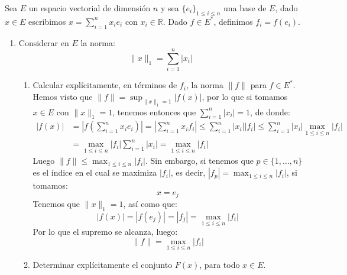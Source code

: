 \begin{ejercicio}\label{ej:2_rel1}
    Sea $E$ un espacio vectorial de dimensión $n$ y sea $\{e_i\}_{1\leq i \leq n}$ una base de $E$, dado $x\in E$ escribimos $x =\sum_{i=1}^{n}x_ie_i$ con $x_i\in \mathbb{R}$. Dado $f\in E^\ast$, definimos $f_i = f(e_i)$.
    \begin{enumerate}[label=\alph*)]
        \item Considerar en $E$ la norma:
            \begin{equation*}
                \|x\|_1 = \sum_{i=1}^{n}|x_i|
            \end{equation*}
            \begin{enumerate}
                \item Calcular explícitamente, en términos de $f_i$, la norma $\|f\|$ para $f\in E^\ast$.\\

                    Hemos visto que $\|f\| = \sup_{\|x\|_1=1}|f(x)|$, por lo que si tomamos $x\in E$ con $\|x\|_1=1$, tenemos entonces que $\sum_{i=1}^{n}|x_i| = 1$, de donde:
                    \begin{align*}
                        |f(x)| &= \left|f\left(\sum_{i=1}^{n}x_ie_i\right)\right| = \left|\sum_{i=1}^{n}x_if_i\right| \leq \sum_{i=1}^{n}|x_i||f_i|  \leq \sum_{i=1}^{n}|x_i|\max_{1\leq i \leq n}|f_i| \\
                               &= \max_{1\leq i\leq n}|f_i| \sum_{i=1}^{n}|x_i| = \max_{1\leq i\leq n}|f_i|
                    \end{align*}
                    Luego $\|f\|\leq \max_{1\leq i\leq n}|f_i|$. Sin embargo, si tenemos que $p\in \{1,\ldots,n\}$ es el índice en el cual se maximiza $|f_i|$, es decir, $|f_p| = \max_{1\leq i\leq n}|f_i|$, si tomamos:
                    \begin{equation*}
                        x = e_j
                    \end{equation*}
                    Tenemos que $\|x\|_1=1$, así como que:
                    \begin{equation*}
                        |f(x)| = |f(e_j)| = |f_j| = \max_{1\leq i \leq n}|f_i|
                    \end{equation*}
                    Por lo que el supremo se alcanza, luego:
                    \begin{equation*}
                        \|f\| = \max_{1\leq i \leq n}|f_i|
                    \end{equation*}
                \item Determinar explícitamente el conjunto $F(x)$, para todo $x\in E$.


\end{enumerate}
\end{enumerate}
\end{ejercicio}
